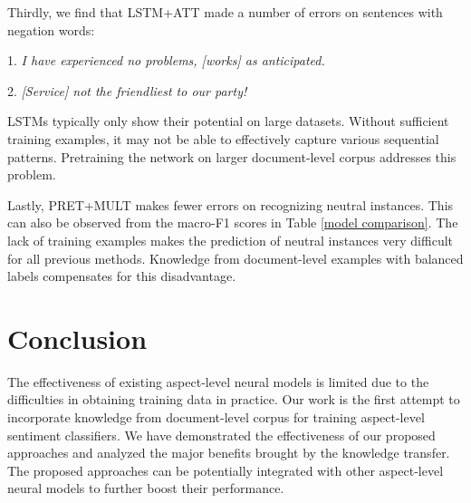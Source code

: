 \documentclass[11pt,a4paper]{article}
\begin{document}
Thirdly, we find that LSTM+ATT made a number of errors on sentences with negation words:

1. \emph{I have experienced no problems, [works] as anticipated.}

2. \emph{[Service] not the friendliest to our party!}

LSTMs typically only show their potential on large datasets. Without sufficient training examples, it may not be able to effectively capture various sequential patterns. Pretraining the network on larger document-level corpus addresses this problem.

Lastly, PRET+MULT makes fewer errors on recognizing neutral instances. This can also be observed from the macro-F1 scores in Table \ref{model comparison}. The lack of training examples makes the prediction of neutral instances very difficult for all previous methods. Knowledge from document-level examples with balanced labels compensates for this disadvantage.


\section{Conclusion}
The effectiveness of existing aspect-level neural models is limited due to the difficulties in obtaining training data in practice.
Our work is the first attempt to incorporate knowledge from document-level corpus for training aspect-level sentiment classifiers. We have demonstrated the effectiveness of our proposed approaches and analyzed the major benefits brought by the knowledge transfer. 
The proposed approaches can be potentially integrated with other aspect-level neural models to further boost their performance.



\end{document}
